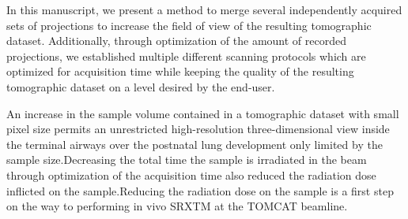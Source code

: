 In this manuscript, we present a method to merge several independently acquired sets of projections to increase the field of view of the resulting tomographic dataset. Additionally, through optimization of the amount of recorded projections, we established multiple different scanning protocols which are optimized for acquisition time while keeping the quality of the resulting tomographic dataset on a level desired by the end-user.
\cbend

An increase in the sample volume contained in a tomographic dataset with small pixel size permits an unrestricted high-resolution three-dimensional view inside the terminal airways over the postnatal lung development only limited by the sample size.\cbstart Decreasing the total time the sample is irradiated in the beam through optimization of the acquisition time also reduced the radiation dose inflicted on the sample.\cbend Reducing the radiation dose on the sample is a first step on the way to performing in vivo SRXTM at the TOMCAT beamline.
